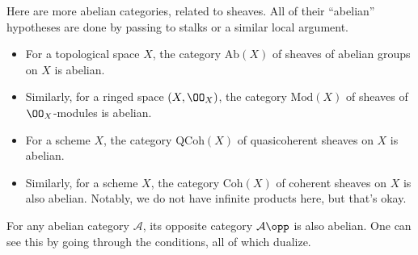 \documentclass[../notes.tex]{subfiles}
\begin{document}
\begin{example}
	Here are more abelian categories, related to sheaves. All of their ``abelian'' hypotheses are done by passing to stalks or a similar local argument.
	\begin{itemize}
		\item For a topological space $X$, the category $\mathrm{Ab}(X)$ of sheaves of abelian groups on $X$ is abelian.
		\item Similarly, for a ringed space $(X,\OO_X)$, the category $\mathrm{Mod}(X)$ of sheaves of $\OO_X$-modules is abelian.
		\item For a scheme $X$, the category $\mathrm{QCoh}(X)$ of quasicoherent sheaves on $X$ is abelian.
		\item Similarly, for a scheme $X$, the category $\mathrm{Coh}(X)$ of coherent sheaves on $X$ is also abelian. Notably, we do not have infinite products here, but that's okay.
	\end{itemize}
\end{example}
\begin{example} \label{ex:ab-op}
	For any abelian category $\mathcal A$, its opposite category $\mathcal A\opp$ is also abelian. One can see this by going through the conditions, all of which dualize.
\end{example}
\end{document}
